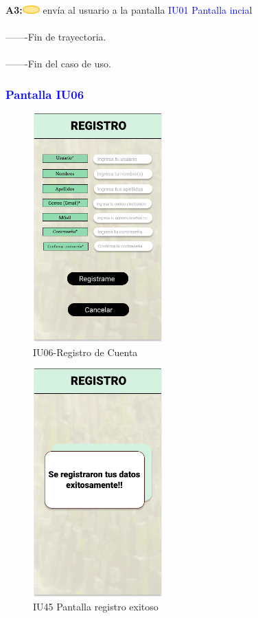                         \textbf{A3:}\includegraphics[width=0.0500\textwidth]{Figuras/sistema.png} envía al usuario a la pantalla \textcolor{blue}{IU01 Pantalla incial} \\\\
                       
        -------Fin de  trayectoria. \\\\
         -------Fin del caso de uso. \\

\subsubsection{\textcolor{blue}{Pantalla IU06}}
\begin{figure}[htbp]
        \centering
        \includegraphics[width= 5cm]{Pantallas Prototipo3/IU06-Registro de Cuenta.jpg}
        \caption{IU06-Registro de Cuenta}
        \label{fig:enter-label}
\end{figure}
\begin{figure}[htbp]
    \centering
    \includegraphics[width= 5cm]{Pantallas Prototipo3/IU45 Pantalla registro exitoso.jpg}
    \caption{IU45 Pantalla registro exitoso}
    \label{fig:enter-label}
\end{figure}

